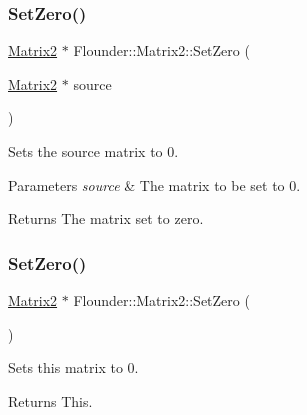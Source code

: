 \subsubsection{\texorpdfstring{Set\+Zero()}{SetZero()}\hspace{0.1cm}{\footnotesize\ttfamily [1/2]}}
{\footnotesize\ttfamily \hyperlink{class_flounder_1_1_matrix2}{Matrix2} $\ast$ Flounder\+::\+Matrix2\+::\+Set\+Zero (\begin{DoxyParamCaption}\item[{\hyperlink{class_flounder_1_1_matrix2}{Matrix2} $\ast$}]{source }\end{DoxyParamCaption})\hspace{0.3cm}{\ttfamily [static]}}



Sets the source matrix to 0. 


\begin{DoxyParams}{Parameters}
{\em source} & The matrix to be set to 0. \\
\hline
\end{DoxyParams}
\begin{DoxyReturn}{Returns}
The matrix set to zero. 
\end{DoxyReturn}
\mbox{\label{class_flounder_1_1_matrix2_a9eb1eb1c5cd7d7830f9be4e273deafeb}} 
\subsubsection{\texorpdfstring{Set\+Zero()}{SetZero()}\hspace{0.1cm}{\footnotesize\ttfamily [2/2]}}
{\footnotesize\ttfamily \hyperlink{class_flounder_1_1_matrix2}{Matrix2} $\ast$ Flounder\+::\+Matrix2\+::\+Set\+Zero (\begin{DoxyParamCaption}{ }\end{DoxyParamCaption})}



Sets this matrix to 0. 

\begin{DoxyReturn}{Returns}
This. 
\end{DoxyReturn}
\mbox{\label{class_flounder_1_1_matrix2_a1467f657660a194b10f6af6f76df35ff}} 
